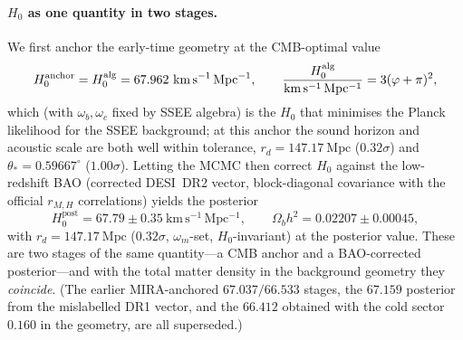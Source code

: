 \documentclass[a4paper,11pt]{article}
\newcommand{\kms}{\mathrm{km\,s^{-1}\,Mpc^{-1}}}
\begin{document}
\paragraph{$H_0$ as one quantity in two stages.} We first anchor the
early-time geometry at the CMB-optimal value
\begin{equation}
  H_0^{\mathrm{anchor}} = H_0^{\rm alg} = 67.962~\kms ,
  \qquad
  \frac{H_0^{\rm alg}}{\kms} = 3(\varphi+\pi)^2 ,
  \label{eq:h0anchor}
\end{equation}
which (with $\omega_b,\omega_c$ fixed by SSEE algebra) is the $H_0$ that
minimises the Planck likelihood for the SSEE background; at this anchor the
sound horizon and acoustic scale are both well within tolerance,
$r_d = 147.17~\mathrm{Mpc}$ ($0.32\sigma$) and
$\theta_\ast = 0.59667^\circ$ ($1.00\sigma$). Letting the MCMC then correct
$H_0$ against the low-redshift BAO (corrected DESI~DR2 vector, block-diagonal
covariance with the official $r_{M,H}$ correlations) yields the posterior
\begin{equation}
  H_0^{\mathrm{post}} = 67.79 \pm 0.35~\kms ,
  \qquad
  \Omega_b h^2 = 0.02207 \pm 0.00045 ,
  \label{eq:h0post}
\end{equation}
with $r_d = 147.17~\mathrm{Mpc}$ ($0.32\sigma$, $\omega_m$-set, $H_0$-invariant)
at the posterior value. These are two stages of the same quantity---a CMB
anchor and a BAO-corrected posterior---and with the total matter density in the
background geometry they \emph{coincide}. (The earlier MIRA-anchored
$67.037/66.533$ stages, the $67.159$ posterior from the mislabelled DR1 vector,
and the $66.412$ obtained with the cold sector $0.160$ in the geometry, are all
superseded.)
\end{document}
